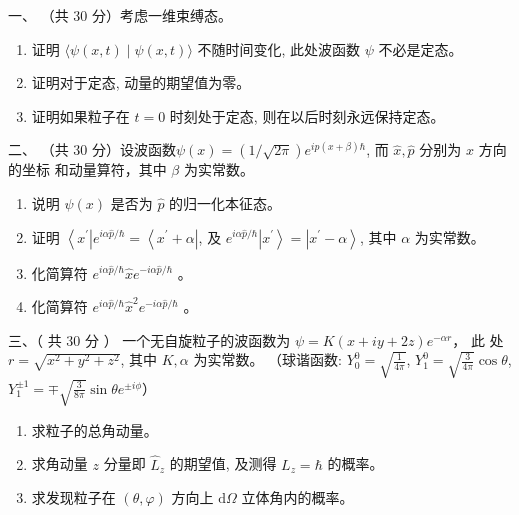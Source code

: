 
一、
	（共 30 分）考虑一维束缚态。
	\begin{enumerate}
		\item
		证明 $\langle\psi(x, t) \mid \psi(x, t)\rangle$ 不随时间变化, 此处波函数 $\psi$ 不必是定态。
		\item 
		证明对于定态, 动量的期望值为零。
		\item 
		证明如果粒子在 $t=0$ 时刻处于定态, 则在以后时刻永远保持定态。
		
		
		
	\end{enumerate}

二、	（共 30 分）设波函数$\psi(x)=(1 / \sqrt{2 \pi}) e^{i p(x+\beta) \hbar}$, 而 $\hat{x}, \hat{p}$ 分别为 $x$ 方向的坐标
和动量算符，其中 $\beta$ 为实常数。
\begin{enumerate}
	\item
说明 $\psi(x)$ 是否为 $\hat{p}$ 的归一化本征态。
\item 
证明 $\left\langle x^{\prime}\right| e^{i \alpha \hat{p} / \hbar}=\left\langle x^{\prime}+\alpha\right|$, 及 $e^{i \alpha \hat{p} / \hbar}\left|x^{\prime}\right\rangle=\left|x^{\prime}-\alpha\right\rangle$, 其中 $\alpha$ 为实常数。
\item 
化简算符 $e^{i \alpha \hat{p} / \hbar} \hat{x} e^{-i \alpha \hat{p} / \hbar}$ 。
\item 
化简算符 $e^{i \alpha \hat{p} / \hbar} \hat{x}^{2} e^{-i \alpha \hat{p} / \hbar}$ 。

\end{enumerate}


三、（ 共 30 分 ） 一个无自旋粒子的波函数为
$\psi=K(x+i y+2 z) e^{-\alpha r} $， 此 处
$r=\sqrt{x^{2}+y^{2}+z^{2}}$, 其中 $K, \alpha$ 为实常数。  （球谐函数: $Y_{0}^{0}=\sqrt{\frac{1}{4 \pi}}$, $ Y_{1}^{0}=\sqrt{\frac{3}{4 \pi}} \cos \theta$, 
$Y_{1}^{\pm 1}=\mp \sqrt{\frac{3}{8 \pi}} \sin \theta e^{\pm i \phi} $）
\begin{enumerate}
	\item
	求粒子的总角动量。
	\item 
	求角动量 $z$ 分量即 $\hat{L}_{z}$ 的期望值, 及测得 $L_{z}=\hbar$ 的概率。
	\item 
	求发现粒子在 $(\theta, \varphi)$ 方向上 $\text{d}  \Omega$ 立体角内的概率。
	
	
	
\end{enumerate}

